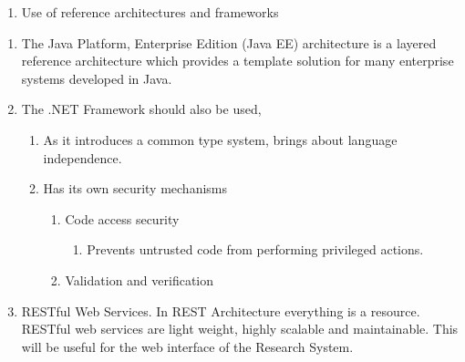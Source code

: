 \documentclass{article} %
\begin{document}


\noindent 

\noindent 

\noindent 

\noindent 

\noindent 

\begin{enumerate}
\item  Use of reference architectures and frameworks 
\end{enumerate}

\noindent 

\begin{enumerate}
\item  The Java Platform, Enterprise Edition (Java EE) architecture is a layered reference architecture which provides a template solution for many enterprise systems developed in Java.

\item  The .NET Framework should also be used, 

\begin{enumerate}
\item  As it introduces a common type system, brings about language independence.

\item  Has its own security mechanisms

\begin{enumerate}
\item  Code access security

\begin{enumerate}
\item  Prevents untrusted code from performing privileged actions.
\end{enumerate}

\item  Validation and verification
\end{enumerate}
\end{enumerate}

\item  RESTful Web Services. In REST Architecture everything is a resource. RESTful web services are light weight, highly scalable and maintainable. This will be useful for the web interface of the Research System.
\end{enumerate}

\noindent 

\noindent 
\end{document}
